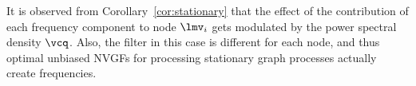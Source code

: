 It is observed from Corollary~\ref{cor:stationary} that the effect of the contribution of each frequency component to node $\lmv_{i}$ gets modulated by the power spectral density $\vcq$. Also, the filter in this case is different for each node, and thus optimal unbiased NVGFs for processing stationary graph processes actually create frequencies.
\fi
